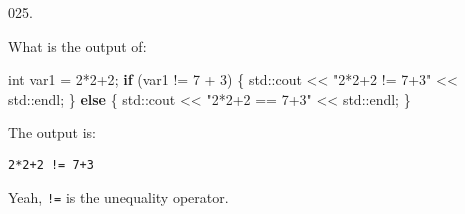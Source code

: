 \documentclass[]{book}
\newenvironment{Shaded}{}{}
\newcommand{\BuiltInTok}[1]{#1}
\newcommand{\ControlFlowTok}[1]{\textcolor[rgb]{0.00,0.44,0.13}{\textbf{#1}}}
\newcommand{\DataTypeTok}[1]{\textcolor[rgb]{0.56,0.13,0.00}{#1}}
\newcommand{\DecValTok}[1]{\textcolor[rgb]{0.25,0.63,0.44}{#1}}
\newcommand{\NormalTok}[1]{#1}
\newcommand{\StringTok}[1]{\textcolor[rgb]{0.25,0.44,0.63}{#1}}
\begin{document}
\begin{minipage}{\linewidth}\noindent
{\tiny 025.}\\
\begin{minipage}[t]{.485\linewidth}

What is the output of:

\begin{framed}

\begin{Shaded}
\begin{Highlighting}[]
\DataTypeTok{int}\NormalTok{ var1 = }\DecValTok{2}\NormalTok{*}\DecValTok{2+2}\NormalTok{;}
\ControlFlowTok{if}\NormalTok{ (var1 != }\DecValTok{7}\NormalTok{ + }\DecValTok{3}\NormalTok{) \{}
  \BuiltInTok{std::}\NormalTok{cout << }\StringTok{"2*2+2 != 7+3"}\NormalTok{ << }\BuiltInTok{std::}\NormalTok{endl;}
\NormalTok{\} }\ControlFlowTok{else}\NormalTok{ \{}
  \BuiltInTok{std::}\NormalTok{cout << }\StringTok{"2*2+2 == 7+3"}\NormalTok{ << }\BuiltInTok{std::}\NormalTok{endl;}
\NormalTok{\}}
\end{Highlighting}
\end{Shaded}

\end{framed}

\end{minipage}
\hfill
\begin{minipage}[t]{.485\linewidth}

The output is:

\begin{framed}

\begin{verbatim}
2*2+2 != 7+3
\end{verbatim}

\end{framed}

Yeah, \texttt{!=} is the unequality operator.

\end{minipage}
\end{minipage}

\vspace{2mm}\noindent\hrulefill{}
\end{document}
